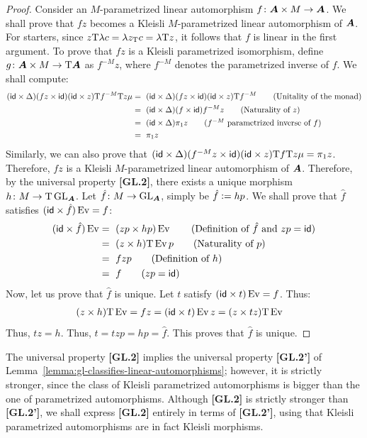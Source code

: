 \begin{proof}
Consider an $M$-parametrized linear automorphism $f\colon\A\times M\to\A$. We shall prove that $fz$ becomes a Kleisli $M$-parametrized linear automorphism of $\A$. For starters, since $z\T\lambda c=\lambda z_\T c=\lambda\T z$, it follows that $f$ is linear in the first argument. To prove that $fz$ is a Kleisli parametrized isomorphism, define $g\colon\A\times M\to\T\A$ as $f^{-M}z$, where $f^{-M}$ denotes the parametrized inverse of $f$. We shall compute:
\begin{align*}
(\id\times\Delta)(fz\times\id)(\id\times z)\T f^{-M}\T z\mu&=~(\id\times\Delta)(fz\times\id)(\id\times z)\T f^{-M}                      \tag{Unitality of the monad}\\
&=~(\id\times\Delta)(f\times\id)f^{-M}z             \tag{Naturality of $z$}\\
&=~(\id\times\Delta)\pi_1z                          \tag{$f^{-M}$ parametrized inverse of $f$}\\
&=~\pi_1z
\end{align*}
Similarly, we can also prove that $(\id\times\Delta)(f^{-M}z\times\id)(\id\times z)\T f\T z\mu=\pi_1z$. Therefore, $fz$ is a Kleisli $M$-parametrized linear automorphism of $\A$. Therefore, by the universal property \textbf{[GL.2]}, there exists a unique morphism $h\colon M\to\T\GL_\A$. Let $\hat f\colon M\to\GL_\A$, simply be $\hat f\=hp$. We shall prove that $\hat f$ satisfies $(\id\times\hat f)\Ev=f$:
\begin{align*}
(\id\times\hat f)\Ev&=~(zp\times hp)\Ev     \tag{Definition of $\hat f$ and $zp=\id$}\\
&=~(z\times h)\T\Ev p                       \tag{Naturality of $p$}\\
&=~fzp                                      \tag{Definition of $h$}\\
&=~f                                        \tag{$zp=\id$}
\end{align*}
Now, let us prove that $\hat f$ is unique. Let $t$ satisfy $(\id\times t)\Ev=f$. Thus:
\begin{align*}
&(z\times h)\T\Ev=fz=(\id\times t)\Ev z=(z\times tz)\T\Ev
\end{align*}
Thus, $tz=h$. Thus, $t=tzp=hp=\hat f$. This proves that $\hat f$ is unique.
\end{proof}

The universal property \textbf{[GL.2]} implies the universal property \textbf{[GL.2']} of Lemma~\ref{lemma:gl-classifies-linear-automorphisms}; however, it is strictly stronger, since the class of Kleisli parametrized automorphisms is bigger than the one of parametrized automorphisms. Although \textbf{[GL.2]} is strictly stronger than \textbf{[GL.2']}, we shall express \textbf{[GL.2]} entirely in terms of \textbf{[GL.2']}, using that Kleisli parametrized automorphisms are in fact Kleisli morphisms.

